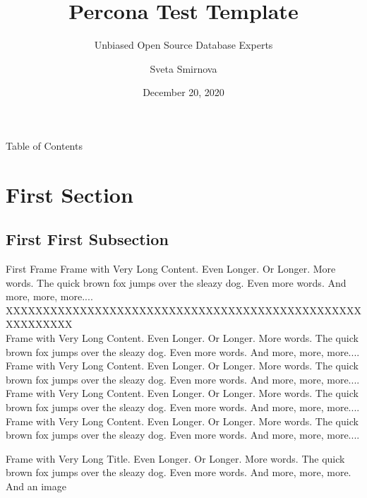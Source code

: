 \documentclass[aspectratio=169]{beamer}
\title[Test]{Percona Test Template}
\subtitle{Unbiased Open Source Database Experts}
\author{Sveta Smirnova}
\institute{Percona}
\date{December 20, 2020}
\begin{document}
	
\begin{frame}
	\titlepage
\end{frame}

\begin{frame}{Table of Contents}
	\vfill
	\tableofcontents
\end{frame}

\section{First Section}

\subsection{First First Subsection}

\begin{frame}{First Frame}
	Frame with Very Long Content. Even Longer. Or Longer. More words. The quick brown fox jumps over the sleazy dog. Even more words. And more, more, more....\\
	XXXXXXXXXXXXXXXXXXXXXXXXXXXXXXXXXXXXXXXXXXXXXXXXXXXXXXXXX \\
	Frame with Very Long Content. Even Longer. Or Longer. More words. The quick brown fox jumps over the sleazy dog. Even more words. And more, more, more....\\
	Frame with Very Long Content. Even Longer. Or Longer. More words. The quick brown fox jumps over the sleazy dog. Even more words. And more, more, more....\\
	Frame with Very Long Content. Even Longer. Or Longer. More words. The quick brown fox jumps over the sleazy dog. Even more words. And more, more, more....\\
	Frame with Very Long Content. Even Longer. Or Longer. More words. The quick brown fox jumps over the sleazy dog. Even more words. And more, more, more....\\
\end{frame}

\begin{frame}{\small{Frame with Very Long Title. Even Longer. Or Longer. More words. The quick brown fox jumps over the sleazy dog. Even more words. And more, more, more.\\And an image}}
	\vfill
\end{frame}
\end{document}

